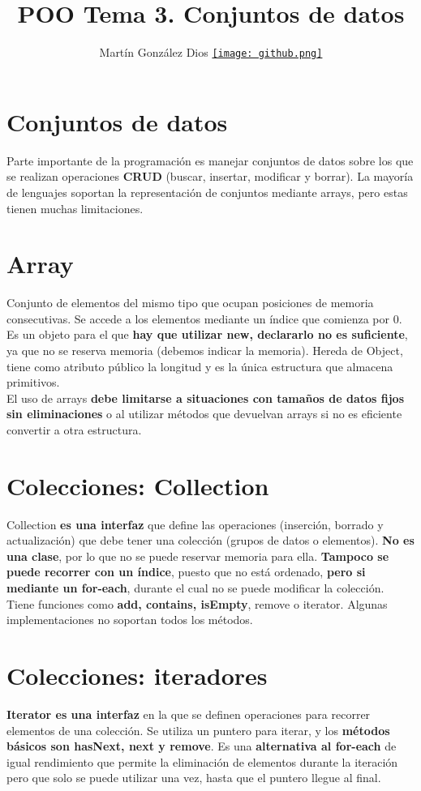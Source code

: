 \documentclass{article}
\title{POO Tema 3. Conjuntos de datos}
\author{Martín González Dios 
\href{https://github.com/martindios}{\texttt{[image: github.png]}}}
\begin{document}
\maketitle

\section{Conjuntos de datos}
Parte importante de la programación es manejar conjuntos de datos sobre los que se realizan operaciones \textbf{CRUD} (buscar, insertar, modificar y borrar). La mayoría de lenguajes soportan la representación de conjuntos mediante arrays, pero estas tienen muchas limitaciones.

\section{Array}
Conjunto de elementos del mismo tipo que ocupan posiciones de memoria consecutivas. Se accede a los elementos mediante un índice que comienza por 0. \\
Es un objeto para el que \textbf{hay que utilizar new, declararlo no es suficiente}, ya que no se reserva memoria (debemos indicar la memoria). Hereda de Object, tiene como atributo público la longitud y es la única estructura que almacena primitivos. \\
El uso de arrays \textbf{debe limitarse a situaciones con tamaños de datos fijos sin eliminaciones} o al utilizar métodos que devuelvan arrays si no es eficiente convertir a otra estructura.

\section{Colecciones: Collection}
Collection \textbf{es una interfaz} que define las operaciones (inserción, borrado y actualización) que debe tener una colección (grupos de datos o elementos). \textbf{No es una clase}, por lo que no se puede reservar memoria para ella. \textbf{Tampoco se puede recorrer con un índice}, puesto que no está ordenado, \textbf{pero si mediante un for-each}, durante el cual no se puede modificar la colección. Tiene funciones como \textbf{add, contains, isEmpty}, remove o iterator. Algunas implementaciones no soportan todos los métodos.

\section{Colecciones: iteradores}
\textbf{Iterator es una interfaz} en la que se definen operaciones para recorrer elementos de una colección. Se utiliza un puntero para iterar, y los \textbf{métodos básicos son hasNext, next y remove}. Es una \textbf{alternativa al for-each} de igual rendimiento que permite la eliminación de elementos durante la iteración pero que solo se puede utilizar una vez, hasta que el puntero llegue al final. 
\end{document}
